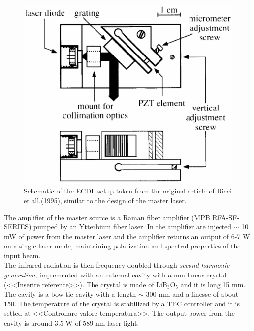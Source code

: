 \documentclass[../thesis.tex]{subfiles}
\begin{document}
\begin{figure}[!htb]
\centering
\includegraphics[scale=1]{laser_ricci.pdf}
\caption{Schematic of the ECDL setup taken from the original article of Ricci et all.(1995)\citet{Ricci95}, similar to the design of the master laser.}
\label{fig:mastlas}
\end{figure}

The amplifier of the master source is a Raman fiber amplifier (MPB RFA-SF-SERIES) pumped by an Ytterbium fiber laser. In the amplifier are injected $\sim$ 10 mW of power from the master laser and the amplifier returns an output of 6-7 W on a single laser mode, maintaining polarization and spectral properties of the input beam.\\

The infrared radiation is then frequency doubled through \textit{second harmonic generation}, implemented with an external cavity with a non-linear crystal (<<Inserire reference>>). The crystal is made of LiB$_3$O$_5$ and it is long 15 mm. The cavity is a bow-tie cavity with a length $\sim$ 300 mm and a finesse of about 150. The temperature of the crystal is stabilized by a TEC controller and it is setted at <<Controllare valore temperatura>>. The output power from the cavity is around 3.5 W of 589 nm laser light.\\
\end{document}
